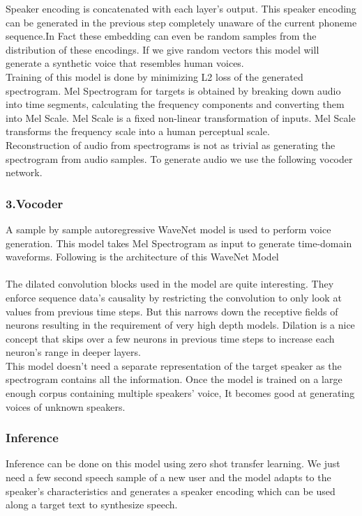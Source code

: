 \documentclass[12pt]{report}
\begin{document}
Speaker encoding is concatenated with each layer’s output. This speaker encoding can be generated in the previous step completely unaware of the current phoneme sequence.In Fact these embedding can even be random samples from the distribution of these encodings. If we give random vectors this model will generate a synthetic voice that resembles human voices.\\

Training of this model is done by minimizing L2 loss of the generated spectrogram. Mel Spectrogram for targets is obtained by breaking down audio into time segments, calculating the frequency components and converting them into Mel Scale. Mel Scale is a fixed non-linear transformation of inputs. Mel Scale transforms the frequency scale into a human perceptual scale.\\

Reconstruction of audio from spectrograms is not as trivial as generating the spectrogram from audio samples. To generate audio we use the following vocoder network.

\subsubsection{3.Vocoder}
A sample by sample autoregressive WaveNet model is used  to perform voice generation. This model takes Mel Spectrogram as input to generate time-domain waveforms. Following is the architecture of this WaveNet Model\\
\\
The dilated convolution blocks used in the model are quite interesting. They enforce sequence data’s causality by restricting the convolution to only look at values from previous time steps. But this narrows down the receptive fields of neurons resulting in the requirement of very high depth models. Dilation is a nice concept that skips over a few neurons in previous time steps to increase each neuron’s range in deeper layers.\\

This model doesn’t need a separate representation of the target speaker as the spectrogram contains all the information. Once the model is trained on a large enough corpus containing multiple speakers’ voice, It becomes good at generating voices of unknown speakers.\\

\subsubsection{Inference}
Inference can be done on this model using zero shot transfer learning. We just need a few second speech sample of a new user and the model adapts to the speaker’s characteristics and generates a speaker encoding which can be used along a target text to synthesize speech.\\ \\
\end{document}

